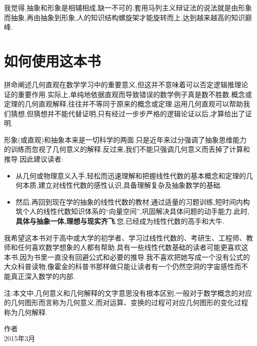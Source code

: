 我觉得,抽象和形象是相辅相成,缺一不可的.套用马列主义辩证法的说法就是由形象而抽象,再由抽象到形象,人的知识结构螺旋架才能旋转而上,达到越来越高的知识巅峰.

\section{如何使用这本书}

拼命阐述几何直观在数学学习中的重要意义,但这并不意味着可以否定逻辑推理论证的重要作用.实际上,单纯地依据直观而导致错误的数学例子真是数不胜数.概念或定理的几何直观解释,往往并不等同于原来的概念或定理.运用几何直观可以帮助我们猜想,但猜想并不能代替证明,只有经过一步步严格的逻辑论证以后,才算给出了证明.

形象(或直观)和抽象本来是一切科学的两面.只是近年来过分强调了抽象思维能力的训练而忽视了几何意义的解释.反过来,我们不能只强调几何意义而丢掉了计算和推导.因此建议读者:

\begin{itemize}
\item
  从几何或物理意义入手,轻松而迅速理解和把握线性代数的基本概念和定理的几何本质,建立对线性代数的感性认识,具备理解复杂及抽象数学的基础.
\item
  然后,再回到现在学的抽象的线性代数的教材,通过适量的习题训练,短时间内构筑个人的线性代数知识体系的``向量空间'',巩固解决具体问题的动手能力.此时,\textbf{具体与抽象一体,理想与现实齐飞}.您,已经成为线性代数的高手和大牛.
\end{itemize}

我希望这本书对于高中或大学的初学者、学习过线性代数的、考研生、工程师、教师和任何喜欢数学想象的人都有帮助.具有一些线性代数基础的读者可能更喜欢这本书,因为书里一直没有回避公式和必要的推导.我不喜欢把她写成一个没有公式的大众科普读物,像霍金的科普书那样做只能让读者有一个仍然空洞的字宙感性而不能真正深入数学的内部.

注:本文中,几何意义和几何解释的文字意思没有根本区别,一般对于数学概念的对应的几何图形而言称为几何意义,而对运算、变换的过程可对应几何图形的变化过程称为几何解释.

\begin{flushright}
    \begin{minipage}[c][5cm][c]{3cm}
        \centering
        作者\\
        2015年3月
    \end{minipage}
\end{flushright}
